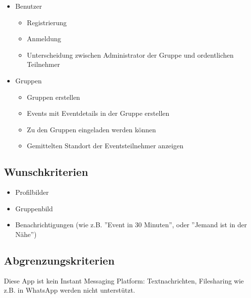 \documentclass[parskip=full]{scrartcl}
\begin{document}
\begin{itemize}[itemsep=0pt]
	\item Benutzer  
	\begin{itemize}
	 	\item Registrierung
	 	\item Anmeldung
	 	\item Unterscheidung zwischen Administrator der Gruppe und ordentlichen Teilnehmer
	\end{itemize} 
	\item Gruppen
		\begin{itemize}
	 		\item Gruppen erstellen
	 		\item Events mit Eventdetails in der Gruppe erstellen 
	 		\item Zu den Gruppen eingeladen werden können
	 		\item Gemittelten Standort der Eventsteilnehmer anzeigen 
		\end{itemize}
\end{itemize}
	
\subsection{Wunschkriterien}
\begin{itemize}
	\item Profilbilder
	\item Gruppenbild
	\item Benachrichtigungen (wie z.B. ''Event in 30 Minuten'', oder ''Jemand ist in der Nähe'')
\end{itemize}

\subsection{Abgrenzungskriterien}
Diese App ist kein Instant Messaging Platform: Textnachrichten, Filesharing wie z.B. in WhatsApp werden nicht unterstützt.
\end{document}
